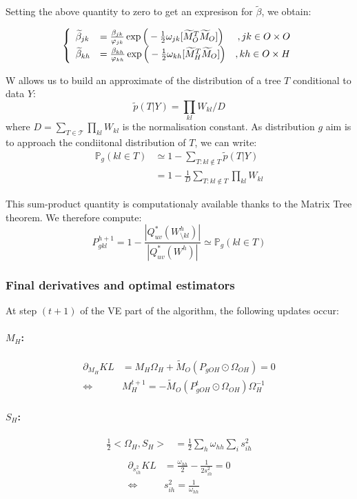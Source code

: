 \documentclass[11pt,a4paper]{article}
\begin{document}
Setting the above quantity to zero to get an expresison for $\widetilde{\beta}$, we obtain:
 
\[\left\{\begin{array}{ll r}
\widetilde{\beta}_{jk} &= \frac{\beta_{jk}}{\varphi_{jk}}\exp\Big(-\frac{1}{2} \omega_{jk}[\widetilde{M}_O^T \widetilde{M}_O]\Big) & ,jk \in O\times O\\
\widetilde{\beta}_{kh} &=\frac{\beta_{kh}}{\varphi_{kh}}\exp\Big(-\frac{1}{2} \omega_{kh}[\widetilde{M}_H^T \widetilde{M}_O]\Big) & ,kh \in O\times H
\end{array}\right.\]
 

W allows us to build an approximate of the distribution of a tree $T$ conditional to  data $Y$:
$$\tilde{p}(T|Y) = \prod_{kl} W_{kl} \big/ D $$
where $D = \sum_{T\in \mathcal{T}}\prod_{kl} W_{kl}$ is the normalisation constant. As distribution $g$ aim is to approach the condiitonal distribution of $T$, we can write:
\begin{align*}
\mathds{P}_g(kl \in T) &\simeq 1 - \sum_{T : kl \notin T}  \tilde{p}(T|Y)\\
&= 1 - \frac{1}{D} \sum_{T : kl \notin T}\prod_{kl} W_{kl}
\end{align*}

This sum-product quantity is computationaly available thanks to the Matrix Tree theorem. We therefore compute:
$$\boxed{P_{gkl}^{h+1} = 1 - \dfrac{|Q_{uv}^*(W_{\setminus kl}^h)|}{|Q_{uv}^*(W^h)|} \simeq\mathds{P}_g(kl \in T)}$$

\subsubsection{Final derivatives and optimal estimators}

At step $(t+1)$ of the VE part of the algorithm, the following updates occur:
\paragraph{$M_H$:}
\begin{align*}
\partial_{M_H} KL &= M_H\Omega_H  + \widetilde{M}_O(P_{gOH}\odot\Omega_{OH}) =0\\
\iff& \boxed{M_H^{t+1} =- \widetilde{M}_O(P_{gOH}^t\odot\Omega_{OH})\Omega_H^{-1}}
\end{align*}


\paragraph{$S_H$:}
\begin{align*}
\frac{1}{2}<\Omega_H, S_H> &= \frac{1}{2} \sum_h \omega_{hh}\sum_i s_{ih}^2\\
\end{align*}
\begin{align*}
\partial_{s_{ih}^2} KL &=  \frac{\omega_{hh}}{2}- \frac{1}{2s_{ih}^2} = 0\\
\iff & \boxed{s_{ih}^2 = \frac{1}{\omega_{hh}}}
\end{align*}
\end{document}
